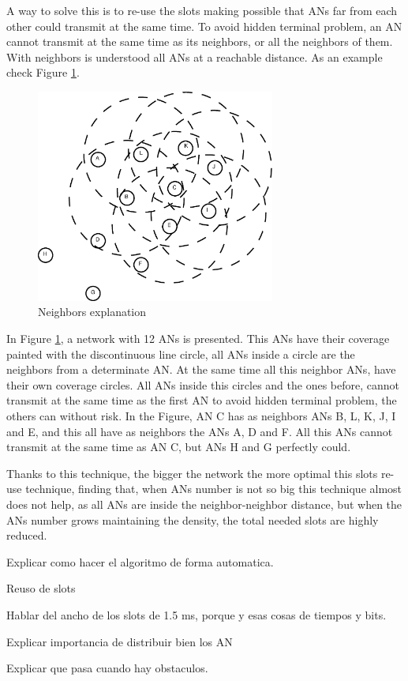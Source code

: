 A way to solve this is to re-use the slots making possible that \acp{AN} far from each other could transmit at the same time. To avoid hidden terminal 
problem, an \ac{AN} cannot transmit at the same time as its neighbors, or all the neighbors of them. With neighbors is understood all \acp{AN} at a 
reachable distance. As an example check Figure \ref{fig:ejemplonetslots}.

\begin{figure}[ht]
 \begin{center}
  \includegraphics[width=0.7\textwidth]{ejemplonetslots.eps}
 \end{center}
 \caption{Neighbors explanation}
 \label{fig:ejemplonetslots}
\end{figure}

In Figure \ref{fig:ejemplonetslots}, a network with 12 \acp{AN} is presented. This \acp{AN} have their coverage painted with the discontinuous line circle,
all \acp{AN} inside a circle are the neighbors from a determinate \ac{AN}. At the same time all this neighbor \acp{AN}, have their own coverage circles.
All \acp{AN} inside this circles and the ones before, cannot transmit at the same time as the first \ac{AN} to avoid hidden terminal problem, the others 
can without risk. In the Figure, \ac{AN} C has as neighbors \acp{AN} B, L, K, J, I and E, and this all have as neighbors the \acp{AN} A, D and F. All this
\acp{AN} cannot transmit at the same time as \ac{AN} C, but \acp{AN} H and G perfectly could.

Thanks to this technique, the bigger the network the more optimal this slots re-use technique, finding that, when \acp{AN} number is not so big this 
technique almost does not help, as all \acp{AN} are inside the neighbor-neighbor distance, but when the \acp{AN} number grows maintaining the 
density, the total needed slots are highly reduced.

Explicar como hacer el algoritmo de forma automatica.

Reuso de slots

Hablar del ancho de los slots de 1.5 ms, porque y esas cosas de tiempos y bits.

Explicar importancia de distribuir bien los AN

Explicar que pasa cuando hay obstaculos.
